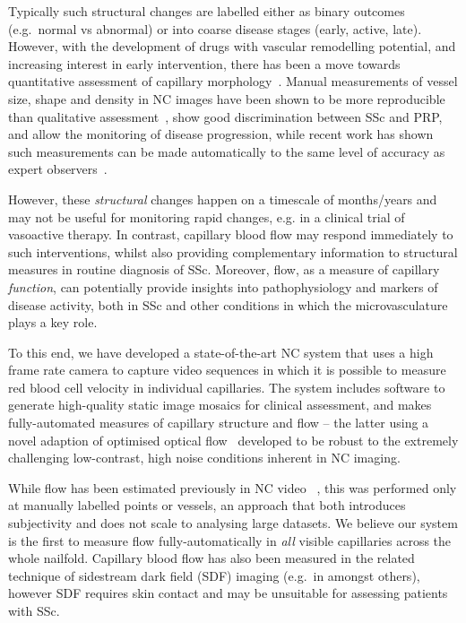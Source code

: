 \documentclass[runningheads,a4paper]{llncs}
\def\eg{e.g.}
\begin{document}
Typically such structural changes are labelled either as binary outcomes (\eg~normal vs abnormal) or into coarse disease stages (early, active, late). However, with the development of drugs with vascular remodelling potential, and increasing interest in early intervention, there has been a move towards quantitative assessment of capillary morphology~\cite{Murray_etal_AR09,Berks_MICCAI14}. Manual measurements of vessel size, shape and density in NC images have been shown to be more reproducible than qualitative assessment~\cite{Murray_etal_AR09}, show good discrimination between SSc and PRP, and allow the monitoring of disease progression, while recent work has shown such measurements can be made automatically to the same level of accuracy as expert observers~\cite{Berks_MICCAI14}.

However, these \textit{structural} changes happen on a timescale of months/years and may not be useful for monitoring rapid changes, e.g. in a clinical trial of vasoactive therapy. In contrast, capillary blood flow may respond immediately to such interventions, whilst also providing complementary information to structural measures in routine diagnosis of SSc. Moreover, flow, as a measure of capillary \textit{function}, can potentially provide insights into pathophysiology and markers of disease activity, both in SSc and other conditions in which the microvasculature plays a key role.%

To this end, we have developed a state-of-the-art NC system that uses a high frame rate camera to capture video sequences in which it is possible to measure red blood cell velocity in individual capillaries. The system includes software to generate high-quality static image mosaics for clinical assessment, and makes fully-automated measures of capillary structure and flow -- the latter using a novel adaption of optimised optical flow~\cite{BroxECCV04} developed to be robust to the extremely challenging low-contrast, high noise conditions inherent in NC imaging. 

While flow has been estimated previously in NC video ~\cite{Mawson_Shore_JMET98,Wu_etal_MR09,Shih_etal_MR11}, this was performed only at manually labelled points or vessels, an approach that both introduces subjectivity and does not scale to analysing large datasets. We believe our system is the first to measure flow fully-automatically in \textit{all} visible capillaries across the whole nailfold. Capillary blood flow has also been measured in the related technique of sidestream dark field (SDF) imaging (\eg~in \cite{DobbeMBEC08} amongst others), however SDF requires skin contact and may be unsuitable for assessing patients with SSc.
\end{document}

